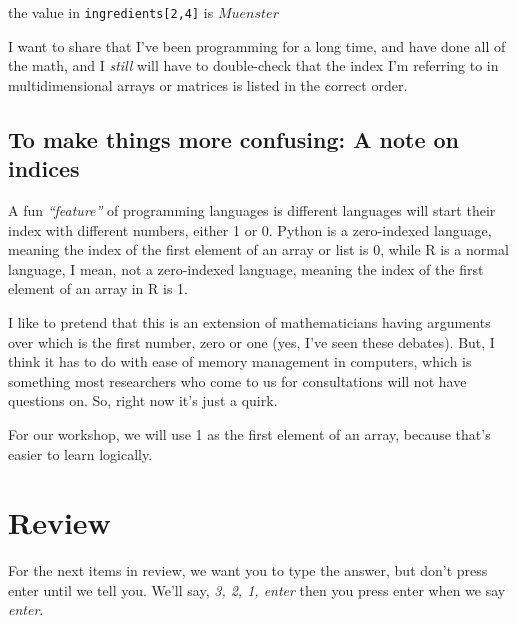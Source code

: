 \documentclass[
]{book}
\begin{document}
the value in \texttt{ingredients{[}2,4{]}} is \(Muenster\)

I want to share that I've been programming for a long time, and have done all of the math, and I \emph{still} will have to double-check that the index I'm referring to in multidimensional arrays or matrices is listed in the correct order.

\subsection{To make things more confusing: A note on indices}\label{to-make-things-more-confusing-a-note-on-indices}

A fun \emph{``feature''} of programming languages is different languages will start their index with different numbers, either 1 or 0. Python is a zero-indexed language, meaning the index of the first element of an array or list is 0, while R is a normal language, I mean, not a zero-indexed language, meaning the index of the first element of an array in R is 1.

I like to pretend that this is an extension of mathematicians having arguments over which is the first number, zero or one (yes, I've seen these debates). But, I think it has to do with ease of memory management in computers, which is something most researchers who come to us for consultations will not have questions on. So, right now it's just a quirk.

For our workshop, we will use 1 as the first element of an array, because that's easier to learn logically.

\section{Review}\label{review}

For the next items in review, we want you to type the answer, but don't press enter until we tell you. We'll say, \emph{3, 2, 1, enter} then you press enter when we say \emph{enter}.
\end{document}
